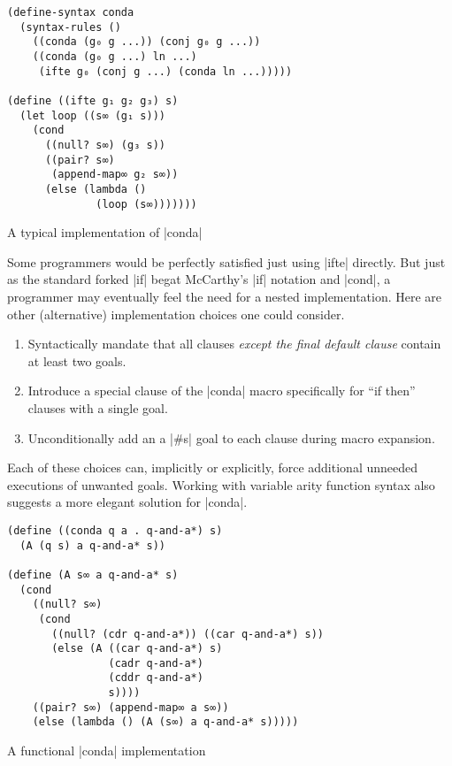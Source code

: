 \documentclass[sigplan,draft,natbib=false]{acmart}
\begin{document}
\begin{listing}
  \begin{verbatim}
(define-syntax conda
  (syntax-rules ()
    ((conda (g₀ g ...)) (conj g₀ g ...))
    ((conda (g₀ g ...) ln ...)
     (ifte g₀ (conj g ...) (conda ln ...)))))

(define ((ifte g₁ g₂ g₃) s)
  (let loop ((s∞ (g₁ s)))
    (cond
      ((null? s∞) (g₃ s))
      ((pair? s∞)
       (append-map∞ g₂ s∞))
      (else (lambda ()
              (loop (s∞)))))))
  \end{verbatim}
  \caption{A typical implementation of \rackinline|conda|}
  \label{mnt:conda-implementation}
\end{listing}

Some programmers would be perfectly satisfied just using
\rackinline|ifte| directly. But just as the standard forked
\rackinline|if| begat McCarthy's \rackinline|if| notation and
\rackinline|cond|, a programmer may eventually feel the need for a
nested implementation. Here are other (alternative) implementation
choices one could consider.

\begin{enumerate}

\item Syntactically mandate that all clauses \emph{except the final
    default clause} contain at least two goals.

\item Introduce a special clause of the \rackinline|conda| macro
  specifically for \enquote{if then} clauses with a single goal.

\item Unconditionally add an a \rackinline|#s| goal to each clause
  during macro expansion.

\end{enumerate}

Each of these choices can, implicitly or explicitly, force additional
unneeded executions of unwanted goals. Working with variable arity
function syntax also suggests a more elegant solution for
\rackinline|conda|.

\begin{listing}
  \begin{verbatim}
(define ((conda q a . q-and-a*) s)
  (A (q s) a q-and-a* s))

(define (A s∞ a q-and-a* s)
  (cond
    ((null? s∞)
     (cond
       ((null? (cdr q-and-a*)) ((car q-and-a*) s))
       (else (A ((car q-and-a*) s)
                (cadr q-and-a*)
                (cddr q-and-a*)
                s))))
    ((pair? s∞) (append-map∞ a s∞))
    (else (lambda () (A (s∞) a q-and-a* s)))))
  \end{verbatim}
  \caption{A functional \rackinline|conda| implementation}
  \label{mnt:conda-good-re-implementation}
\end{listing}
\end{document}
